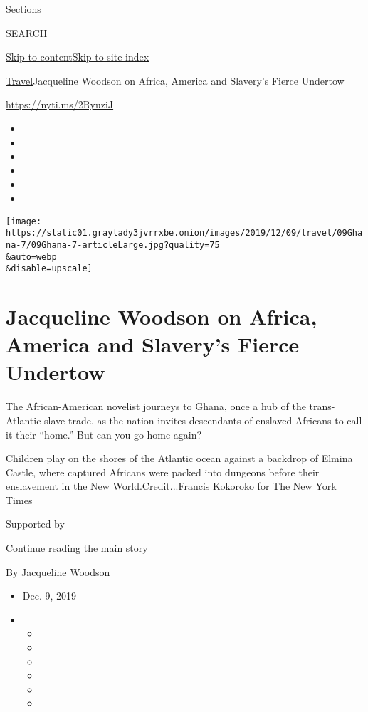 Sections

SEARCH

\protect\hyperlink{site-content}{Skip to
content}\protect\hyperlink{site-index}{Skip to site index}

\href{/section/travel}{Travel}\textbar{}Jacqueline Woodson on Africa,
America and Slavery's Fierce Undertow

\url{https://nyti.ms/2RyuziJ}

\begin{itemize}
\item
\item
\item
\item
\item
\item
\end{itemize}

\texttt{[image: https://static01.graylady3jvrrxbe.onion/images/2019/12/09/travel/09Ghana-7/09Ghana-7-articleLarge.jpg?quality=75\\\&auto=webp\\\&disable=upscale]}

\hypertarget{jacqueline-woodson-on-africa-america-and-slaverys-fierce-undertow}{%
\section{Jacqueline Woodson on Africa, America and Slavery's Fierce
Undertow}\label{jacqueline-woodson-on-africa-america-and-slaverys-fierce-undertow}}

The African-American novelist journeys to Ghana, once a hub of the
trans-Atlantic slave trade, as the nation invites descendants of
enslaved Africans to call it their ``home.'' But can you go home again?

Children play on the shores of the Atlantic ocean against a backdrop of
Elmina Castle, where captured Africans were packed into dungeons before
their enslavement in the New World.Credit...Francis Kokoroko for The New
York Times

Supported by

\protect\hyperlink{after-sponsor}{Continue reading the main story}

By Jacqueline Woodson

\begin{itemize}
\item
  Dec. 9, 2019
\item
  \begin{itemize}
  \item
  \item
  \item
  \item
  \item
  \item
  \end{itemize}
\end{itemize}

